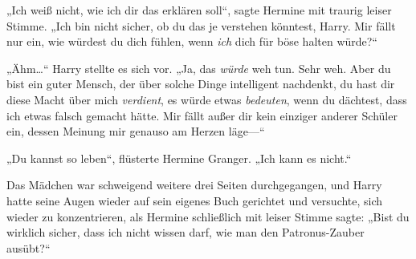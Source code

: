 „Ich weiß nicht, wie ich dir das erklären soll“, sagte Hermine mit traurig leiser Stimme.
„Ich bin nicht sicher, ob du das je verstehen könntest, Harry. Mir fällt nur ein, wie würdest du dich fühlen, wenn \emph{ich} dich für böse halten würde?“

„Ähm…“ Harry stellte es sich vor.
„Ja, das \emph{würde} weh tun. Sehr weh. Aber du bist ein guter Mensch, der über solche Dinge intelligent nachdenkt, du hast dir diese Macht über mich \emph{verdient}, es würde etwas \emph{bedeuten}, wenn du dächtest, dass ich etwas falsch gemacht hätte. Mir fällt außer dir kein einziger anderer Schüler ein, dessen Meinung mir genauso am Herzen läge—“

„Du kannst so leben“, flüsterte Hermine Granger.
„Ich kann es nicht.“

Das Mädchen war schweigend weitere drei Seiten durchgegangen, und Harry hatte seine Augen wieder auf sein eigenes Buch gerichtet und versuchte, sich wieder zu konzentrieren, als Hermine schließlich mit leiser Stimme sagte:
„Bist du wirklich sicher, dass ich nicht wissen darf, wie man den Patronus-Zauber ausübt?“

